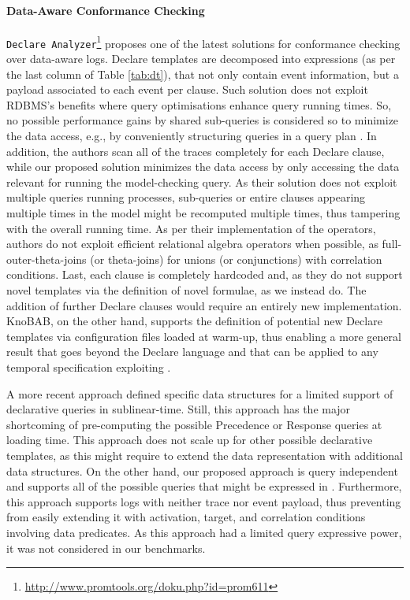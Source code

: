 \paragraph*{Data-Aware Conformance Checking}
\texttt{Declare Analyzer}\footnote{\url{http://www.promtools.org/doku.php?id=prom611}} \cite{BurattinMS16} proposes one of the latest solutions for conformance checking over data-aware logs. Declare templates are decomposed into \LTLf expressions (as per the last column of Table \ref{tab:dt}), that not only contain event information, but a payload associated to each event per clause. 
Such solution
does not exploit RDBMS's 
benefits %
where %
query optimisations enhance query running times. 
So, no possible performance gains by shared sub-queries 
is considered so to minimize the data access, e.g., by conveniently 
structuring queries in a query plan \cite{BellatrecheKB21}. 
In addition, the authors
scan all of the traces completely for each Declare clause, while our proposed solution minimizes the data access by only accessing the data relevant for running the model-checking query. 
As their solution does not exploit multiple queries running processes, sub-queries or entire clauses appearing multiple times in the model might be recomputed multiple times, thus tampering with the overall running time.
As per their implementation of the \LTLf operators, authors do not exploit efficient relational algebra operators when possible, as full-outer-theta-joins (or theta-joins) for unions (or conjunctions) with correlation conditions.
%
Last, each clause is completely hardcoded and, as they do not support novel templates via the definition of novel \LTLf formulae, as we instead do. The addition of further Declare clauses would require an entirely new implementation. KnoBAB, on the other hand, supports the definition of potential new Declare templates via configuration files loaded at warm-up, %
thus enabling a more general result that goes beyond the Declare language and that can be applied to any temporal specification exploiting \LTLf.

A more recent approach \cite{abs-2112-04623} defined specific data structures for a limited support of declarative queries in sublinear-time. Still, this approach has the major shortcoming of pre-computing the possible \textsf{Precedence} or \textsf{Response} queries at loading time. This approach does not scale up for other possible declarative templates, as this might require to extend the data representation  with additional data structures. On the other hand, our proposed approach is query independent and supports all of the possible queries that might be expressed in \xLTLf. Furthermore, this approach supports logs with neither trace nor event payload, thus preventing from easily extending it with activation, target, and correlation conditions involving data predicates. As this approach had a limited query expressive power, it was not considered in our benchmarks.

